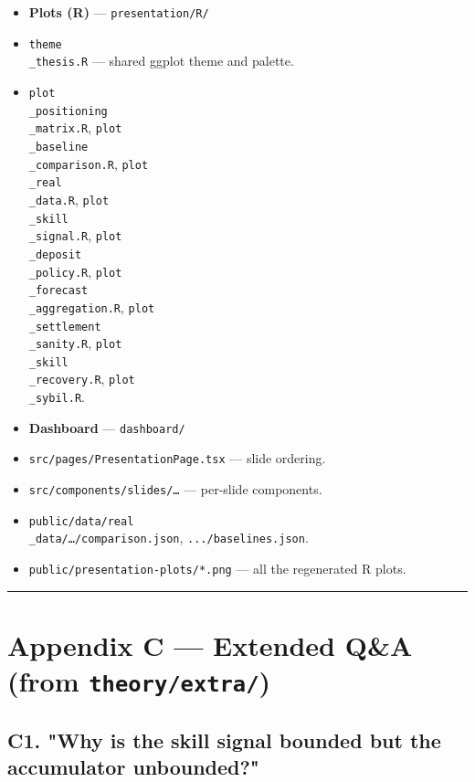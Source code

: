 \documentclass[11pt]{article}
\begin{document}
\begin{itemize}
\item \textbf{Plots (R)} --- \texttt{presentation/R/}
\item \texttt{theme\\_thesis.R} --- shared ggplot theme and palette.
\item \texttt{plot\\_positioning\\_matrix.R}, \texttt{plot\\_baseline\\_comparison.R}, \texttt{plot\\_real\\_data.R}, \texttt{plot\\_skill\\_signal.R}, \texttt{plot\\_deposit\\_policy.R}, \texttt{plot\\_forecast\\_aggregation.R}, \texttt{plot\\_settlement\\_sanity.R}, \texttt{plot\\_skill\\_recovery.R}, \texttt{plot\\_sybil.R}.
\end{itemize}

\begin{itemize}
\item \textbf{Dashboard} --- \texttt{dashboard/}
\item \texttt{src/pages/PresentationPage.tsx} --- slide ordering.
\item \texttt{src/components/slides/\ldots{}} --- per-slide components.
\item \texttt{public/data/real\\_data/\ldots{}/comparison.json}, \texttt{.../baselines.json}.
\item \texttt{public/presentation-plots/*.png} --- all the regenerated R plots.
\end{itemize}

\bigskip\hrule\bigskip

\section{Appendix C --- Extended Q\&A (from \texttt{theory/extra/})}


\subsection{C1. "Why is the skill signal bounded but the accumulator unbounded?"}
\end{document}
